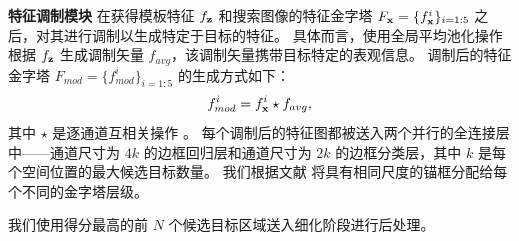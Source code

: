 \textbf{特征调制模块} 在获得模板特征 $f_{\textbf z}$ 和搜索图像的特征金字塔 $F_{\textbf x} = \{f_{\textbf x}^i\}_{i=1:5}$ 之后，对其进行调制以生成特定于目标的特征。
具体而言，使用全局平均池化操作根据 $f_{\textbf z}$ 生成调制矢量 $f_{avg}$，该调制矢量携带目标特定的表观信息。
调制后的特征金字塔 $F_{mod} = \{f_{mod}^i\}_{i=1:5}$ 的生成方式如下：
\begin{equation}
    f_{mod}^i = f^i_{\textbf x} \star f_{avg},
\end{equation}
其中 $\star$ 是逐通道互相关操作 \cite{SiamRPN++}。
每个调制后的特征图都被送入两个并行的全连接层中——通道尺寸为 $4k$ 的边框回归层和通道尺寸为 $2k$ 的边框分类层，其中 $k$ 是每个空间位置的最大候选目标数量。
我们根据文献 \cite{lin2017feature} 将具有相同尺度的锚框分配给每个不同的金字塔层级。%

我们使用得分最高的前 $N$ 个候选目标区域送入细化阶段进行后处理。

